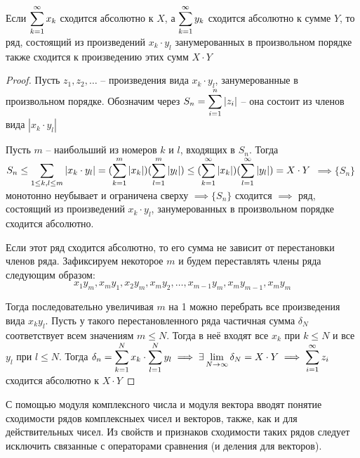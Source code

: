 \begin{theorem}
    Если $\displaystyle\sum_{k=1}^\infty x_k$ сходится абсолютно к $X$, а $\displaystyle\sum_{k=1}^\infty y_k$ сходится
    абсолютно к сумме $Y$, то ряд, состоящий из произведений $x_k \cdot y_l$
    занумерованных в произвольном порядке также сходится к произведению
    этих сумм $X \cdot Y$
\end{theorem}
\begin{proof}
    Пусть $z_1, z_2, \dots$ -- произведения вида $x_k \cdot y_l$, занумерованные
    в произвольном порядке. Обозначим через $S_n = \displaystyle\sum_{i = 1}^n |z_i|$ --
    она состоит из членов вида $|x_k \cdot y_l|$

    Пусть $m$ -- наибольший из номеров $k$ и $l$, входящих в $S_n$. Тогда
    $S_n \leq \displaystyle\sum_{1 \leq k, l \leq m} |x_k \cdot y_l|
    = (\displaystyle\sum_{k = 1}^m |x_k|) (\displaystyle\sum_{l = 1}^m |y_l|)
    \leq (\displaystyle\sum_{k = 1}^\infty |x_k|) (\displaystyle\sum_{l = 1}^\infty |y_l|) 
    = X \cdot Y$
    $\implies \{ S_n \}$ монотонно неубывает и ограничена сверху 
    $\implies \{ S_n \}$ сходится 
    $\implies$ ряд, состоящий из произведений $x_k \cdot y_l$, занумерованных
    в произвольном порядке сходится абсолютно.

    Если этот ряд сходится абсолютно, то его сумма не зависит от перестановки
    членов ряда. Зафиксируем некоторое $m$ и будем переставлять члены ряда
    следующим образом:
    \[ x_1 y_m, x_m y_1, x_2 y_m, x_m y_2, \dots, x_{m - 1} y_m, x_m y_{m - 1}, x_m y_m \]

    Тогда последовательно увеличивая $m$ на 1 можно перебрать все произведения
    вида $x_k y_l$. Пусть у такого перестановленного ряда частичная сумма
    $\delta_N$ соответствует всем значениям $m \leq N$. Тогда в неё входят все
    $x_k$ при $k \leq N$ и все $y_l$ при $l \leq N$.
    Тогда $\delta_n = \displaystyle\sum_{k = 1}^N x_k \cdot \displaystyle\sum_{l = 1}^N y_l
    \implies \exists \displaystyle\lim_{N \to \infty} \delta_N = X \cdot Y
    \implies \displaystyle\sum_{i = 1}^\infty z_i$ сходится абсолютно к $X \cdot Y$
\end{proof}

\begin{remark}
    С помощью модуля комплексного числа и модуля вектора вводят понятие 
    сходимости рядов комплексныех чисел и векторов, также, как и для
    действительных чисел. Из свойств и признаков сходимости таких рядов следует 
    исключить связанные с операторами сравнения (и деления для векторов).
\end{remark}